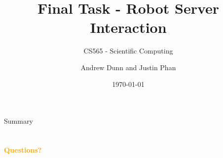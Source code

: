 \documentclass[aspectratio=43]{beamer}
\title{Final Task - Robot Server Interaction} %
\subtitle{CS565 - Scientific Computing}
\author[A. Dunn \& J. Phan]{Andrew Dunn and Justin Phan}
\institute[CSCWU]{
    Department of Computer Science%
    \\%
    Central Washington University%
} %
\date{\today}
\begin{document}
    
    \frame{\titlepage}
    
    \begin{frame}{Summary}
        \tableofcontents
    \end{frame}
     
    
    
    
     
    
    
    
     
    
    

    \section{}
    \begin{frame}{}
        \centering
            \Huge\bfseries
        \textcolor{orange}{Questions?}
    \end{frame}
\end{document}
